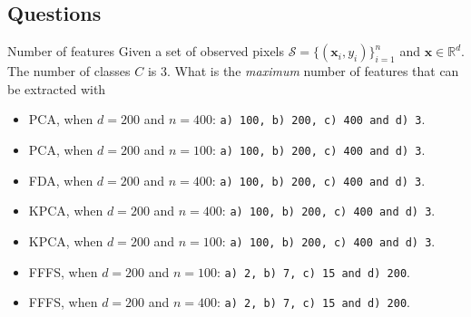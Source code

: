 \documentclass[10pt,aspectratio=1610]{beamer}
\begin{document}
\subsection{Questions}
\label{sec:org09d397b}
\begin{frame}[fragile,label={sec:org184dc8a}]{Number of features}
 Given         a         set         of         observed         pixels
\(\mathcal{S}=\{(\mathbf{x}_i,y_i)\}_{i=1}^n\)                       and
\(\mathbf{x}\in\mathbb{R}^{d}\). The number of classes \(C\) is \(3\).  What
is the \emph{maximum} number of features that can be extracted with

\begin{itemize}
\item <1> PCA, when \(d=200\) and \(n=400\): \texttt{a) 100, b) 200, c) 400 and d) 3}.
\item <2> PCA, when \(d=200\) and \(n=100\):  \texttt{a) 100, b) 200, c) 400 and d) 3}.
\item <3> FDA, when \(d=200\) and \(n=400\):  \texttt{a) 100, b) 200, c) 400 and d) 3}.
\item <4> KPCA, when \(d=200\) and \(n=400\):  \texttt{a) 100, b) 200, c) 400 and d) 3}.
\item <5> KPCA, when \(d=200\) and \(n=100\):  \texttt{a) 100, b) 200, c) 400 and d) 3}.
\item <6> FFFS, when \(d=200\) and \(n=100\):  \texttt{a) 2, b) 7, c) 15 and d) 200}.
\item <7> FFFS, when \(d=200\) and \(n=400\):  \texttt{a) 2, b) 7, c) 15 and d) 200}.
\end{itemize}
\end{frame}
\end{document}
